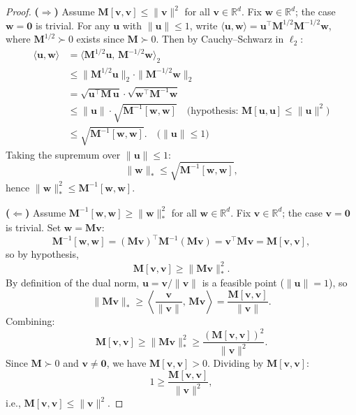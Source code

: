 \documentclass[12pt]{article}
\begin{document}
\begin{proof}
\textbf{($\Rightarrow$)}
Assume $\mathbf{M}[\mathbf{v}, \mathbf{v}] \leq \|\mathbf{v}\|^2$ for all $\mathbf{v} \in \mathbb{R}^d$. Fix $\mathbf{w} \in \mathbb{R}^d$; the case $\mathbf{w} = \mathbf{0}$ is trivial. For any $\mathbf{u}$ with $\|\mathbf{u}\| \leq 1$, write $\langle \mathbf{u}, \mathbf{w} \rangle = \mathbf{u}^\top \mathbf{M}^{1/2} \mathbf{M}^{-1/2} \mathbf{w}$, where $\mathbf{M}^{1/2} \succ 0$ exists since $\mathbf{M} \succ 0$. Then by Cauchy--Schwarz in $\ell_2$:
\begin{align*}
\langle \mathbf{u}, \mathbf{w} \rangle &= \langle \mathbf{M}^{1/2}\mathbf{u},\, \mathbf{M}^{-1/2}\mathbf{w} \rangle_2 \\
&\leq \|\mathbf{M}^{1/2}\mathbf{u}\|_2 \cdot \|\mathbf{M}^{-1/2}\mathbf{w}\|_2 \\
&= \sqrt{\mathbf{u}^\top \mathbf{M}\, \mathbf{u}} \cdot \sqrt{\mathbf{w}^\top \mathbf{M}^{-1} \mathbf{w}} \\
&\leq \|\mathbf{u}\| \cdot \sqrt{\mathbf{M}^{-1}[\mathbf{w}, \mathbf{w}]} \quad \text{(hypothesis: $\mathbf{M}[\mathbf{u}, \mathbf{u}] \leq \|\mathbf{u}\|^2$)} \\
&\leq \sqrt{\mathbf{M}^{-1}[\mathbf{w}, \mathbf{w}]}. \quad \text{($\|\mathbf{u}\| \leq 1$)}
\end{align*}
Taking the supremum over $\|\mathbf{u}\| \leq 1$:
\[
\|\mathbf{w}\|_* \leq \sqrt{\mathbf{M}^{-1}[\mathbf{w}, \mathbf{w}]},
\]
hence $\|\mathbf{w}\|_*^2 \leq \mathbf{M}^{-1}[\mathbf{w}, \mathbf{w}]$.

\bigskip

\textbf{($\Leftarrow$)}
Assume $\mathbf{M}^{-1}[\mathbf{w}, \mathbf{w}] \geq \|\mathbf{w}\|_*^2$ for all $\mathbf{w} \in \mathbb{R}^d$. Fix $\mathbf{v} \in \mathbb{R}^d$; the case $\mathbf{v} = \mathbf{0}$ is trivial. Set $\mathbf{w} = \mathbf{M}\mathbf{v}$:
\[
\mathbf{M}^{-1}[\mathbf{w}, \mathbf{w}] = (\mathbf{M}\mathbf{v})^\top \mathbf{M}^{-1}(\mathbf{M}\mathbf{v}) = \mathbf{v}^\top \mathbf{M} \mathbf{v} = \mathbf{M}[\mathbf{v}, \mathbf{v}],
\]
so by hypothesis,
\[
\mathbf{M}[\mathbf{v}, \mathbf{v}] \geq \|\mathbf{M}\mathbf{v}\|_*^2.
\]
By definition of the dual norm, $\mathbf{u} = \mathbf{v}/\|\mathbf{v}\|$ is a feasible point ($\|\mathbf{u}\| = 1$), so
\[
\|\mathbf{M}\mathbf{v}\|_* \geq \left\langle \frac{\mathbf{v}}{\|\mathbf{v}\|},\, \mathbf{M}\mathbf{v} \right\rangle = \frac{\mathbf{M}[\mathbf{v}, \mathbf{v}]}{\|\mathbf{v}\|}.
\]
Combining:
\[
\mathbf{M}[\mathbf{v}, \mathbf{v}] \geq \|\mathbf{M}\mathbf{v}\|_*^2 \geq \frac{(\mathbf{M}[\mathbf{v}, \mathbf{v}])^2}{\|\mathbf{v}\|^2}.
\]
Since $\mathbf{M} \succ 0$ and $\mathbf{v} \neq \mathbf{0}$, we have $\mathbf{M}[\mathbf{v}, \mathbf{v}] > 0$. Dividing by $\mathbf{M}[\mathbf{v}, \mathbf{v}]$:
\[
1 \geq \frac{\mathbf{M}[\mathbf{v}, \mathbf{v}]}{\|\mathbf{v}\|^2},
\]
i.e., $\mathbf{M}[\mathbf{v}, \mathbf{v}] \leq \|\mathbf{v}\|^2$.
\end{proof}
\end{document}
